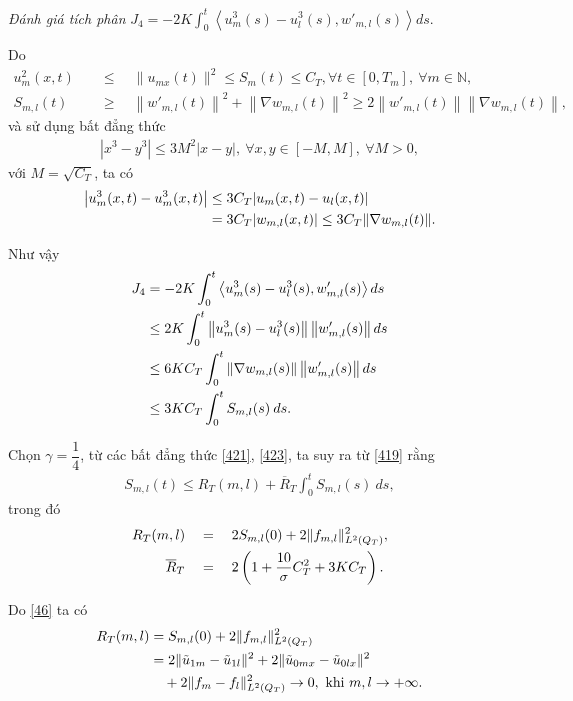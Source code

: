 \documentclass[12pt,a4paper]{article}
\def\N{\mathbb{N}}
\theoremstyle{definition}
\theoremstyle{definition}
\begin{document}
\textit{Đánh giá tích phân} $\displaystyle J_4 = - 2K \int_0^t \left< u^3_m(s) - u^3_l(s), w'_{m,l}(s)\right> ds$.

Do
\begin{align*}
    u_m^2(x,t) \quad &\le \quad \|u_{mx}(t)\|^2 \le S_m(t) \le C_T, \forall t \in [0,T_m],\ \forall m \in \N, \\
    S_{m,l}(t) \quad &\ge \quad \left\|w'_{m,l}(t)\right\|^2 + \left\|\nabla w_{m,l}(t)\right\|^2 \ge 2 \left\|w'_{m,l}(t)\right\| \left\|\nabla w_{m,l}(t)\right\|,
\end{align*}
và sử dụng bất đẳng thức
\begin{align} \label{422}
    |x^3 - y^3| \le 3M^2 |x-y|,\ \forall x, y \in [-M,M],\ \forall M > 0,
\end{align}
với $M = \sqrt{C_T}$, ta có
\begin{align*}
    \left|u_m^3(x,t) - u_m^3(x,t)\right|
    &\le 3C_T |u_m(x,t) - u_l(x,t)| \\
    &= 3C_T |w_{m,l}(x,t)| \le 3C_T \|\nabla w_{m,l}(t)\|. \notag
\end{align*}

Như vậy
\begin{align} \label{423}
    J_4 &= - 2K \int_0^t \left< u^3_m(s) - u^3_l(s), w'_{m,l}(s)\right> ds \\
    &\le 2K \int_0^t \left\|u^3_m(s) - u^3_l(s)\right\| \left\|w'_{m,l}(s)\right\| ds \notag \\
    &\le 6KC_T \int_0^t \left\|\nabla w_{m,l}(s)\right\| \left\|w'_{m,l}(s)\right\| ds \notag \\
    &\le 3KC_T \int_0^t S_{m,l}(s)\:ds. \notag
\end{align}

Chọn $\gamma = \dfrac{1}{4}$, từ các bất đẳng thức \eqref{421}, \eqref{423}, ta suy ra từ \eqref{419} rằng
\begin{align} \label{424}
    S_{m,l}(t) \le R_T(m,l) + \overline{R}_T \int_0^t S_{m,l}(s)\:ds,
\end{align}
trong đó
\begin{align}
    R_T(m,l) \quad &= \quad 2S_{m,l}(0) + 2 \|f_{m,l}\|^2_{L^2(Q_T)}, \\
    \overline{R}_T \quad &= \quad 2 \left(1 + \frac{10}{\sigma} C_T^2 + 3KC_T\right). \notag
\end{align}

Do \eqref{46} ta có
\begin{align} \label{426}
    R_T(m,l) &= S_{m,l}(0) + 2\|f_{m,l}\|^2_{L^2(Q_T)} \\
    &= 2 \|\tilde{u}_{1m} - \tilde{u}_{1l}\|^2 + 2 \| \tilde{u}_{0mx} - \tilde{u}_{0lx} \|^2 \notag \\
    &\quad + 2 \|f_m - f_l\|^2_{L^2(Q_T)} \to 0, \text{ khi } m,l \to +\infty. \notag
\end{align}
\end{document}
